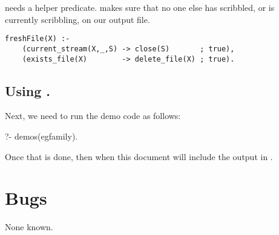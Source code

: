 \documentclass[twocolumn,global]{svjour}
\begin{document}
 needs a helper predicate.  
makes sure that no one
else has scribbled, or is currently scribbling, on our output file.

\begin{Verbatim}
freshFile(X) :- 
    (current_stream(X,_,S) -> close(S)       ; true),
    (exists_file(X)        -> delete_file(X) ; true).
\end{Verbatim}
\subsection{ Using .}
 Next, we need to run the demo code as follows: 
\begin{LISTING}
?- demos(egfamily).
\end{LISTING}
Once that is done, then when this document will include the
output in .

\section{ Bugs }
 None known. 

\theend
\end{document}
